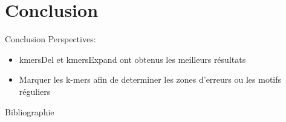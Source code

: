 \documentclass[11pt]{beamer}
\begin{document}
\section{Conclusion}
\begin{frame}{Conclusion}
  Perspectives:\medskip\pause
  \begin{itemize}[<+-| alert@+>]
    \item kmersDel et kmersExpand ont obtenus les meilleurs résultats
    \item Marquer les k-mers afin de determiner les zones d'erreurs ou les motifs réguliers
  \end{itemize}
\end{frame}

\begin{frame}[allowframebreaks]{Bibliographie}
  
  
\end{frame}
\end{document}
